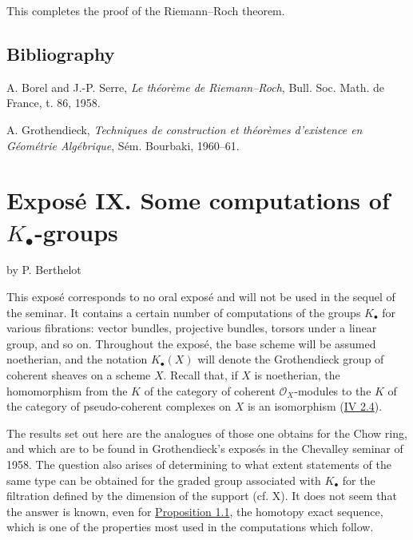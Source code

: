 This completes the proof of the Riemann--Roch theorem.

\subsection*{Bibliography}
\begin{enumerate}[label={[\arabic*]}]
\item A. Borel and J.-P. Serre, \emph{Le théorème de Riemann--Roch}, Bull. Soc. Math. de France, t. 86, 1958.
\item A. Grothendieck, \emph{Techniques de construction et théorèmes d'existence en Géométrie Algébrique}, Sém. Bourbaki, 1960--61.
\end{enumerate}



\section*{Exposé IX. Some computations of $K_\bullet$-groups}
\begin{center}
by P. Berthelot
\end{center}

This exposé corresponds to no oral exposé and will not be used in the sequel of the seminar. It contains a certain number of computations of the groups $K_\bullet$ for various fibrations: vector bundles, projective bundles, torsors under a linear group, and so on. Throughout the exposé, the base scheme will be assumed noetherian, and the notation $K_\bullet(X)$ will denote the Grothendieck group of coherent sheaves on a scheme $X$. Recall that, if $X$ is noetherian, the homomorphism from the $K$ of the category of coherent $\mathcal O_X$-modules to the $K$ of the category of pseudo-coherent complexes on $X$ is an isomorphism (\hyperlink{sga6.e04.para.2-4}{IV 2.4}).

The results set out here are the analogues of those one obtains for the Chow ring, and which are to be found in Grothendieck's exposés in the Chevalley seminar of 1958. The question also arises of determining to what extent statements of the same type can be obtained for the graded group associated with $K_\bullet$ for the filtration defined by the dimension of the support (cf. X). It does not seem that the answer is known, even for \hyperlink{sga6.e09.prop.1-1}{Proposition 1.1}, the homotopy exact sequence, which is one of the properties most used in the computations which follow.

